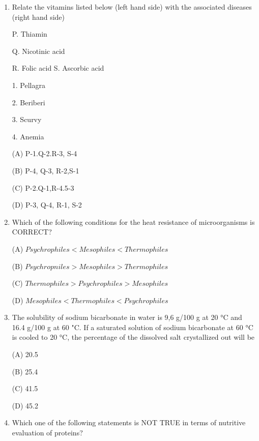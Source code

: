 \documentclass[journal]{IEEEtran}
\begin{document}
\begin{enumerate}
{water both (D) Gram negative, non-motile, non-spore forming and transmitted by fecal-oral route
		}
	\item {Relate the vitamins listed below (left hand side) with the associated diseases (right hand side)}
		\newline
\begin{minipage}{0.5\textwidth}
	\begin{flushleft}

P. Thiamin

Q. Nicotinic acid

R. Folic acid
S. Ascorbic acid
		\end{flushleft}
		\end{minipage}
	\begin{minipage}{0.5\textwidth}
		\begin{flushleft}
1. Pellagra

2. Beriberi

3. Scurvy

4. Anemia
		\end{flushleft}
		\end{minipage}


(A) P-1.Q-2.R-3, S-4

(B) P-4, Q-3, R-2,S-1

(C) P-2.Q-1,R-4.5-3

(D) P-3, Q-4, R-1, S-2

\item{ Which of the following conditions for the heat resistance of microorganisms is CORRECT?

(A) $Psychrophiles < Mesophiles < Thermophiles$

(B) $Psychropniles > Mesophiles > Thermophiles$

(C) $Thermophiles > Psychrophiles > Mesophiles$

(D) $Mesophiles <Thermophiles < Psychrophiles$
}
\item{ The solubility of sodium bicarbonate in water is 9,6 g/100 g at 20 °C and 16.4 g/100 g at 60 "C. If a saturated solution of sodium bicarbonate at 60 °C is cooled to 20 °C, the percentage of the dissolved salt crystallized out will be

(A) 20.5

(B) 25.4

(C) 41.5

(D) 45.2
}

\item {Which one of the following statements is NOT TRUE in terms of nutritive evaluation of proteins?

}
\end{enumerate}
\end{document}
